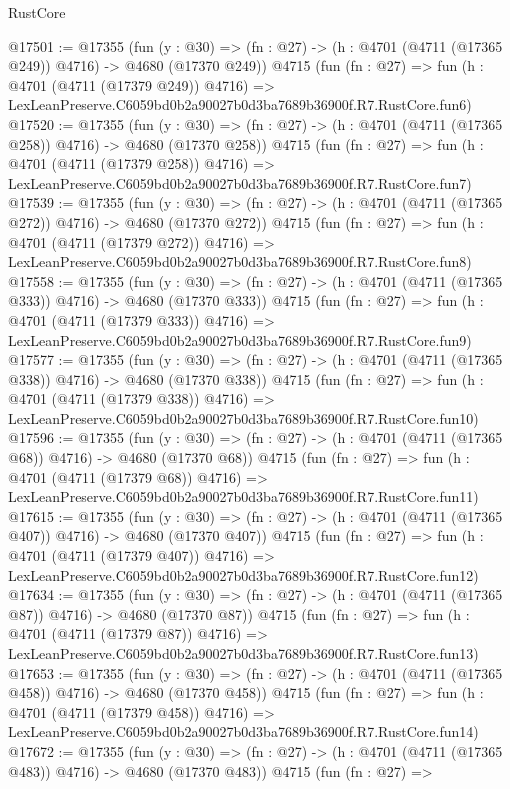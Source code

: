 \begin{lexlean}{RustCore}
\begin{coremodule}
@17501 := @17355
    (fun (y : @30) => (fn : @27) -> (h : @4701 (@4711 (@17365 @249)) @4716) -> @4680 (@17370 @249))
    @4715
    (fun (fn : @27) =>
    fun (h : @4701 (@4711 (@17379 @249)) @4716) =>
    LexLeanPreserve.C6059bd0b2a90027b0d3ba7689b36900f.R7.RustCore.fun6)
@17520 := @17355
    (fun (y : @30) => (fn : @27) -> (h : @4701 (@4711 (@17365 @258)) @4716) -> @4680 (@17370 @258))
    @4715
    (fun (fn : @27) =>
    fun (h : @4701 (@4711 (@17379 @258)) @4716) =>
    LexLeanPreserve.C6059bd0b2a90027b0d3ba7689b36900f.R7.RustCore.fun7)
@17539 := @17355
    (fun (y : @30) => (fn : @27) -> (h : @4701 (@4711 (@17365 @272)) @4716) -> @4680 (@17370 @272))
    @4715
    (fun (fn : @27) =>
    fun (h : @4701 (@4711 (@17379 @272)) @4716) =>
    LexLeanPreserve.C6059bd0b2a90027b0d3ba7689b36900f.R7.RustCore.fun8)
@17558 := @17355
    (fun (y : @30) => (fn : @27) -> (h : @4701 (@4711 (@17365 @333)) @4716) -> @4680 (@17370 @333))
    @4715
    (fun (fn : @27) =>
    fun (h : @4701 (@4711 (@17379 @333)) @4716) =>
    LexLeanPreserve.C6059bd0b2a90027b0d3ba7689b36900f.R7.RustCore.fun9)
@17577 := @17355
    (fun (y : @30) => (fn : @27) -> (h : @4701 (@4711 (@17365 @338)) @4716) -> @4680 (@17370 @338))
    @4715
    (fun (fn : @27) =>
    fun (h : @4701 (@4711 (@17379 @338)) @4716) =>
    LexLeanPreserve.C6059bd0b2a90027b0d3ba7689b36900f.R7.RustCore.fun10)
@17596 := @17355
    (fun (y : @30) => (fn : @27) -> (h : @4701 (@4711 (@17365 @68)) @4716) -> @4680 (@17370 @68))
    @4715
    (fun (fn : @27) =>
    fun (h : @4701 (@4711 (@17379 @68)) @4716) =>
    LexLeanPreserve.C6059bd0b2a90027b0d3ba7689b36900f.R7.RustCore.fun11)
@17615 := @17355
    (fun (y : @30) => (fn : @27) -> (h : @4701 (@4711 (@17365 @407)) @4716) -> @4680 (@17370 @407))
    @4715
    (fun (fn : @27) =>
    fun (h : @4701 (@4711 (@17379 @407)) @4716) =>
    LexLeanPreserve.C6059bd0b2a90027b0d3ba7689b36900f.R7.RustCore.fun12)
@17634 := @17355
    (fun (y : @30) => (fn : @27) -> (h : @4701 (@4711 (@17365 @87)) @4716) -> @4680 (@17370 @87))
    @4715
    (fun (fn : @27) =>
    fun (h : @4701 (@4711 (@17379 @87)) @4716) =>
    LexLeanPreserve.C6059bd0b2a90027b0d3ba7689b36900f.R7.RustCore.fun13)
@17653 := @17355
    (fun (y : @30) => (fn : @27) -> (h : @4701 (@4711 (@17365 @458)) @4716) -> @4680 (@17370 @458))
    @4715
    (fun (fn : @27) =>
    fun (h : @4701 (@4711 (@17379 @458)) @4716) =>
    LexLeanPreserve.C6059bd0b2a90027b0d3ba7689b36900f.R7.RustCore.fun14)
@17672 := @17355
    (fun (y : @30) => (fn : @27) -> (h : @4701 (@4711 (@17365 @483)) @4716) -> @4680 (@17370 @483))
    @4715
    (fun (fn : @27) =>

\end{coremodule}
\end{lexlean}
